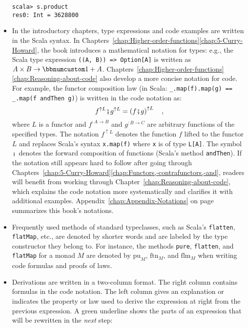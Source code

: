 \begin{itemize}
\begin{lstlisting}[mathescape=true]
scala> s.product
res0: Int = 3628800 
\end{lstlisting}
\item In the introductory chapters, type expressions and code examples are
written in the Scala syntax. In Chapters~\ref{chap:Higher-order-functions}\textendash \ref{chap:5-Curry-Howard},
the book introduces a mathematical notation for types: e.g., the Scala
type expression \lstinline!((A, B)) => Option[A]! is written as $A\times B\rightarrow\bbnum 1+A$.
Chapters~\ref{chap:Higher-order-functions}\textendash \ref{chap:Reasoning-about-code}
also develop a more concise notation for code. For example, the functor
composition law (in Scala: \lstinline!_.map(f).map(g) == _.map(f andThen g)!)
is written in the code notation as:
\[
f^{\uparrow L}\bef g^{\uparrow L}=\left(f\bef g\right)^{\uparrow L}\quad,
\]
where $L$ is a functor and $f^{:A\rightarrow B}$ and $g^{:B\rightarrow C}$
are arbitrary functions of the specified types. The notation $f^{\uparrow L}$
denotes the function $f$ lifted to the functor $L$ and replaces
Scala\textsf{'}s syntax \lstinline!x.map(f)! where \lstinline!x! is of type
\lstinline!L[A]!. The symbol $\bef$ denotes the forward composition
of functions (Scala\textsf{'}s method \lstinline!andThen!). If the notation
still appears hard to follow after going through Chapters~\ref{chap:5-Curry-Howard}\textendash \ref{chap:Functors,-contrafunctors,-and},
readers will benefit from working through Chapter~\ref{chap:Reasoning-about-code},
which explains the code notation more systematically and clarifies
it with additional examples. Appendix~\ref{chap:Appendix-Notations}
on page~\pageref{chap:Appendix-Notations} summarizes this book\textsf{'}s
notations.
\item Frequently used methods of standard typeclasses, such as Scala\textsf{'}s \lstinline!flatten!,
\lstinline!flatMap!, etc., are denoted by shorter words and are labeled
by the type constructor they belong to. For instance, the methods
\lstinline!pure!, \lstinline!flatten!, and \lstinline!flatMap!
for a monad $M$ are denoted by $\text{pu}_{M}$, $\text{ftn}_{M}$,
and $\text{flm}_{M}$ when writing code formulas and proofs of laws.
\item Derivations are written in a two-column format. The right column contains
formulas in the code notation. The left column gives an explanation
or indicates the property or law used to derive the expression at
right from the previous expression. A green underline shows the parts
of an expression that will be rewritten in the \emph{next} step:
\begin{align*}

\end{align*}
\end{itemize}
